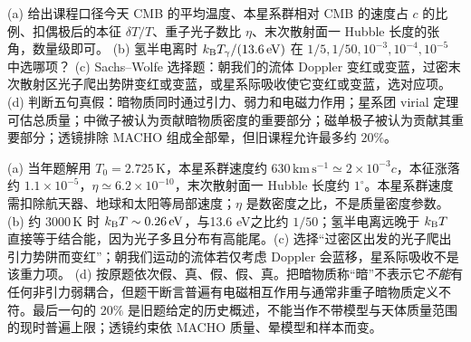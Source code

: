 \begin{exercise}
(a) 给出课程口径今天 CMB 的平均温度、本星系群相对 CMB 的速度占 $c$ 的比例、扣偶极后的本征 $\delta T/T$、重子光子数比 $\eta$、末次散射面一 Hubble 长度的张角，数量级即可。
(b) 氢半电离时 $k_{\mathrm B} T_\gamma/(13.6\,\mathrm{eV})$ 在 $1/5,1/50,10^{-3},10^{-4},10^{-5}$ 中选哪项？
(c) Sachs--Wolfe 选择题：朝我们的流体 Doppler 变红或变蓝，过密末次散射区光子爬出势阱变红或变蓝，或星系际吸收使它变红或变蓝，选对应项。
(d) 判断五句真假：暗物质同时通过引力、弱力和电磁力作用；星系团 virial 定理可估总质量；中微子被认为贡献暗物质密度的重要部分；磁单极子被认为贡献其重要部分；透镜排除 MACHO 组成全部晕，但旧课程允许最多约 $20\%$。
\end{exercise}
\begin{solution}
(a) 当年题解用 $T_0=2.725\,\mathrm K$，本星系群速度约 $630\,\mathrm{km\,s^{-1}}\simeq2\times10^{-3}c$，本征涨落约 $1.1\times10^{-5}$，$\eta\simeq6.2\times10^{-10}$，末次散射面一 Hubble 长度约 $1^\circ$。本星系群速度需扣除航天器、地球和太阳等局部速度；$\eta$ 是数密度之比，不是质量密度参数。
(b) 约 $3000\,\mathrm K$ 时 $k_{\mathrm B} T\sim0.26\,\mathrm{eV}$，与13.6 eV之比约 $1/50$；氢半电离远晚于 $k_{\mathrm B} T$ 直接等于结合能，因为光子多且分布有高能尾。(c) 选择“过密区出发的光子爬出引力势阱而变红”；朝我们运动的流体若仅考虑 Doppler 会蓝移，星系际吸收不是该重力项。
(d) 按原题依次假、真、假、假、真。把暗物质称“暗”不表示它\emph{不能}有任何非引力弱耦合，但题干断言普遍有电磁相互作用与通常非重子暗物质定义不符。最后一句的 $20\%$ 是旧题给定的历史概述，不能当作不带模型与天体质量范围的现时普遍上限；透镜约束依 MACHO 质量、晕模型和样本而变。
\end{solution}

